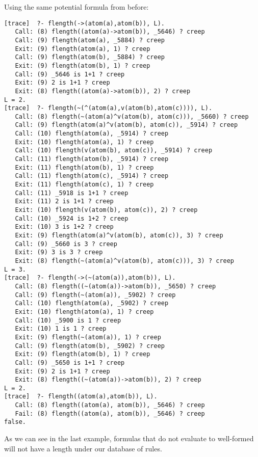 \documentclass[fullpage]{article}
\begin{document}
Using the same potential formula from before:
 \\
\begin{verbatim}
[trace]  ?- flength(->(atom(a),atom(b)), L).
   Call: (8) flength((atom(a)->atom(b)), _5646) ? creep
   Call: (9) flength(atom(a), _5884) ? creep
   Exit: (9) flength(atom(a), 1) ? creep
   Call: (9) flength(atom(b), _5884) ? creep
   Exit: (9) flength(atom(b), 1) ? creep
   Call: (9) _5646 is 1+1 ? creep
   Exit: (9) 2 is 1+1 ? creep
   Exit: (8) flength((atom(a)->atom(b)), 2) ? creep
L = 2.
[trace]  ?- flength(~(^(atom(a),v(atom(b),atom(c)))), L).
   Call: (8) flength(~(atom(a)^v(atom(b), atom(c))), _5660) ? creep
   Call: (9) flength(atom(a)^v(atom(b), atom(c)), _5914) ? creep
   Call: (10) flength(atom(a), _5914) ? creep
   Exit: (10) flength(atom(a), 1) ? creep
   Call: (10) flength(v(atom(b), atom(c)), _5914) ? creep
   Call: (11) flength(atom(b), _5914) ? creep
   Exit: (11) flength(atom(b), 1) ? creep
   Call: (11) flength(atom(c), _5914) ? creep
   Exit: (11) flength(atom(c), 1) ? creep
   Call: (11) _5918 is 1+1 ? creep
   Exit: (11) 2 is 1+1 ? creep
   Exit: (10) flength(v(atom(b), atom(c)), 2) ? creep
   Call: (10) _5924 is 1+2 ? creep
   Exit: (10) 3 is 1+2 ? creep
   Exit: (9) flength(atom(a)^v(atom(b), atom(c)), 3) ? creep
   Call: (9) _5660 is 3 ? creep
   Exit: (9) 3 is 3 ? creep
   Exit: (8) flength(~(atom(a)^v(atom(b), atom(c))), 3) ? creep
L = 3.
[trace]  ?- flength(->(~(atom(a)),atom(b)), L).
   Call: (8) flength((~(atom(a))->atom(b)), _5650) ? creep
   Call: (9) flength(~(atom(a)), _5902) ? creep
   Call: (10) flength(atom(a), _5902) ? creep
   Exit: (10) flength(atom(a), 1) ? creep
   Call: (10) _5900 is 1 ? creep
   Exit: (10) 1 is 1 ? creep
   Exit: (9) flength(~(atom(a)), 1) ? creep
   Call: (9) flength(atom(b), _5902) ? creep
   Exit: (9) flength(atom(b), 1) ? creep
   Call: (9) _5650 is 1+1 ? creep
   Exit: (9) 2 is 1+1 ? creep
   Exit: (8) flength((~(atom(a))->atom(b)), 2) ? creep
L = 2.
[trace]  ?- flength((atom(a),atom(b)), L).
   Call: (8) flength((atom(a), atom(b)), _5646) ? creep
   Fail: (8) flength((atom(a), atom(b)), _5646) ? creep
false.
\end{verbatim}

As we can see in the last example, formulas that do not evaluate to well-formed will not have a length under our database of rules.
\end{document}
